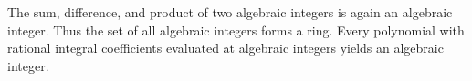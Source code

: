 The sum, difference, and product of two algebraic integers is again an algebraic integer. Thus the set of all algebraic integers forms a ring. Every polynomial with rational integral coefficients evaluated at algebraic integers yields an algebraic integer.
